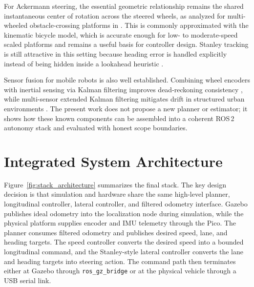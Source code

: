 \documentclass[conference]{IEEEtran}
\begin{document}
For Ackermann steering, the essential geometric relationship remains the shared
instantaneous center of rotation across the steered wheels, as analyzed for
multi-wheeled obstacle-crossing platforms in \cite{Xu2023}. This is commonly
approximated with the kinematic bicycle model, which is accurate enough for low-
to moderate-speed scaled platforms and remains a useful basis for controller
design. Stanley tracking is still attractive in this setting
because heading error is handled explicitly instead of being hidden inside a
lookahead heuristic \cite{Hoffmann2007}.

Sensor fusion for mobile robots is also well established. Combining wheel
encoders with inertial sensing via Kalman filtering improves dead-reckoning
consistency \cite{Peiris2024}, while multi-sensor extended Kalman filtering
mitigates drift in structured urban environments \cite{Georgiev2004}. The present
work does not propose a new planner or estimator; it shows how these known
components can be assembled into a coherent ROS\,2 autonomy stack and evaluated
with honest scope boundaries.

\section{Integrated System Architecture}
\label{sec:architecture}

Figure~\ref{fig:stack_architecture} summarizes the final stack. The key design
decision is that simulation and hardware share the same high-level planner,
longitudinal controller, lateral controller, and filtered odometry interface.
Gazebo publishes ideal odometry into the localization node during simulation,
while the physical platform supplies encoder and IMU telemetry through the Pico.
The planner consumes filtered odometry and publishes desired speed, lane, and
heading targets. The speed controller converts the desired speed into a bounded
longitudinal command, and the Stanley-style lateral controller converts the lane
and heading targets into steering action. The command path then terminates either
at Gazebo through \texttt{ros\_gz\_bridge} or at the physical vehicle through a
USB serial link.
\end{document}
